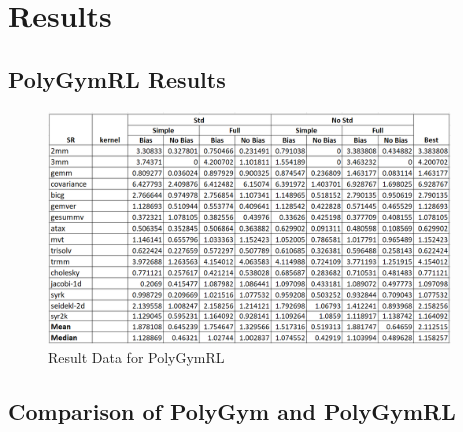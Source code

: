 \documentclass[logo,msc]{infthesis}           %
\begin{document}
\appendix

\chapter{Results}

\section{PolyGymRL Results}

\begin{figure}[htbp]
  \centering
  \includegraphics[width=0.95\textwidth]{Images/BenchMarking.png}    
  \caption{Result Data for PolyGymRL}
  \label{fig:BenchMarking}
\end{figure}

\section{Comparison of PolyGym and PolyGymRL}
\end{document}
